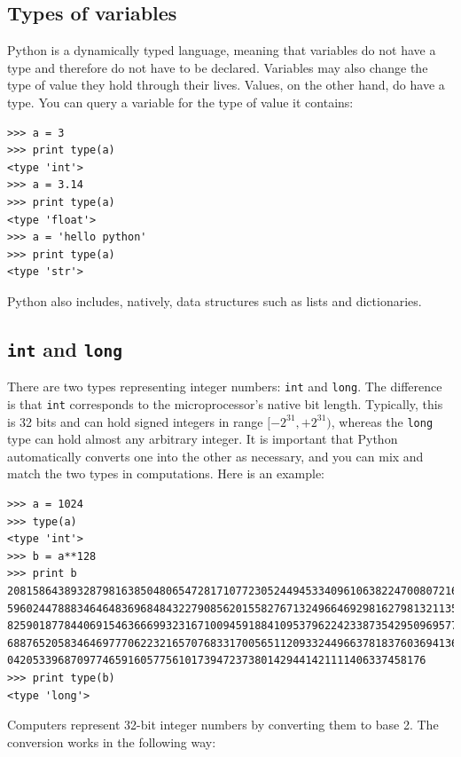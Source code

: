 \documentclass[justified,sixbynine]{tufte-book}
\def\ft{\small\tt}
\theoremstyle{plain}%
\theoremstyle{definition}
\theoremstyle{remark}
\begin{document}
\begin{fullwidth}
\goodbreak\section{Types of variables}

Python is a dynamically typed language, meaning that variables do not have a type and therefore do not have to be declared.  Variables may also change the type of value they hold through their lives.  Values, on the other hand, do have a type. You can query a variable for the type of value it contains:

\begin{lstlisting}
>>> a = 3
>>> print type(a)
<type 'int'>
>>> a = 3.14
>>> print type(a)
<type 'float'>
>>> a = 'hello python'
>>> print type(a)
<type 'str'>
\end{lstlisting}

Python also includes, natively, data structures such as lists and dictionaries.

\goodbreak\subsection{{\ft int} and {\ft long}}


There are two types representing integer numbers: {\ft int} and {\ft long}. The difference is that {\ft int} corresponds to the microprocessor's native bit length.  Typically, this is 32 bits and can hold signed integers in range $[-2^{31},+2^{31})$, whereas the {\ft long} type can hold almost any arbitrary integer. It is important that Python automatically converts one into the other as necessary, and you can mix and match the two types in computations. Here is an example:

\begin{lstlisting}
>>> a = 1024
>>> type(a)
<type 'int'>
>>> b = a**128
>>> print b
20815864389328798163850480654728171077230524494533409610638224700807216119346720
59602447888346464836968484322790856201558276713249664692981627981321135464152584
82590187784406915463666993231671009459188410953796224233873542950969577339250027
68876520583464697770622321657076833170056511209332449663781837603694136444406281
042053396870977465916057756101739472373801429441421111406337458176
>>> print type(b)
<type 'long'>
\end{lstlisting}

Computers represent 32-bit integer numbers by converting them to base 2. The conversion works in the following way:


\end{fullwidth}
\end{document}
